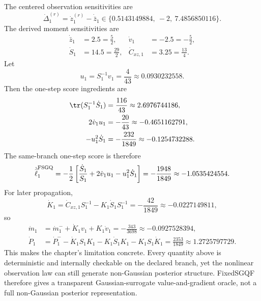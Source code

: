 The centered observation sensitivities are
\begin{equation}
  \dot\Delta_1^{(r)}=\dot z_1^{(r)}-\dot{\bar z}_1
  \in
  \{0.5143149884,\ -2,\ 7.4856850116\}.
  \label{eq:bf-hd-sgqf-example-Deltadot}
\end{equation}
The derived moment sensitivities are
\begin{align}
  \dot{\bar z}_1&=2.5=\frac52,
  &\dot v_1&=-2.5=-\frac52,
  \label{eq:bf-hd-sgqf-example-zbar-v-dot}\\
  \dot S_1&=14.5=\frac{29}{2},
  &\dot C_{xz,1}&=3.25=\frac{13}{4}.
  \label{eq:bf-hd-sgqf-example-S-Cxz-dot}
\end{align}
Let
\begin{equation}
  u_1=S_1^{-1}v_1=\frac{4}{43}\approx0.0930232558.
  \label{eq:bf-hd-sgqf-example-u}
\end{equation}
Then the one-step score ingredients are
\begin{align}
  \tr(S_1^{-1}\dot S_1)&=\frac{116}{43}\approx2.6976744186,
  \label{eq:bf-hd-sgqf-example-score-term1}\\
  2\dot v_1u_1&=-\frac{20}{43}\approx-0.4651162791,
  \label{eq:bf-hd-sgqf-example-score-term2}\\
  -u_1^2\dot S_1&=-\frac{232}{1849}\approx-0.1254732288.
  \label{eq:bf-hd-sgqf-example-score-term3}
\end{align}
The same-branch one-step score is therefore
\begin{equation}
  \dot{\widehat\ell}_1^{\rm FSGQ}
  =
  -\frac12\left[
    \frac{\dot S_1}{S_1}
    +2\dot v_1u_1
    -u_1^2\dot S_1
  \right]
  =-\frac{1948}{1849}
  \approx -1.0535424554.
  \label{eq:bf-hd-sgqf-example-ell-dot}
\end{equation}
For later propagation,
\begin{equation}
  \dot K_1
  =
  \dot C_{xz,1}S_1^{-1}-K_1\dot S_1S_1^{-1}
  =-\frac{42}{1849}
  \approx -0.0227149811,
  \label{eq:bf-hd-sgqf-example-Kdot}
\end{equation}
so
\begin{align}
  \dot m_1&=\dot m_1^-+\dot K_1v_1+K_1\dot v_1
  =-\frac{343}{3698}
  \approx -0.0927528394,
  \label{eq:bf-hd-sgqf-example-mdot}\\
  \dot P_1&=\dot P_1^- -\dot K_1S_1K_1-K_1\dot S_1K_1-K_1S_1\dot K_1
  =\frac{2353}{1849}
  \approx 1.2725797729.
  \label{eq:bf-hd-sgqf-example-Pdot}
\end{align}
This makes the chapter's limitation concrete.  Every quantity above is
deterministic and internally checkable on the declared branch, yet the nonlinear
observation law can still generate non-Gaussian posterior structure.  FixedSGQF
therefore gives a transparent Gaussian-surrogate value-and-gradient oracle, not a
full non-Gaussian posterior representation.

